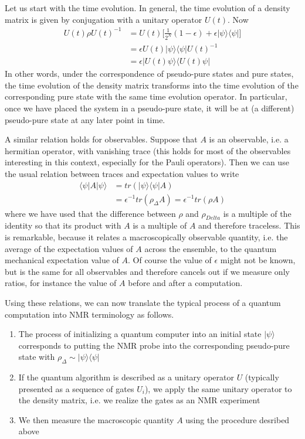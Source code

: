 \documentclass[a4paper, draft]{article}
\theoremstyle{own}
\theoremstyle{remark}
\begin{document}
Let us start with the time evolution. In general, the time evolution of a density matrix is given by conjugation with a unitary operator $U(t)$. Now
\begin{align*}
U(t) \rho U(t)^{-1} &= U(t) \big[   \frac{1}{2^N} (1-\epsilon) + \epsilon |\psi \rangle \langle \psi |  \big] \\
&= \epsilon U(t) |\psi \rangle \langle \psi | U(t)^{-1} \\
&= \epsilon |U(t) \psi \rangle \langle U(t) \psi |
\end{align*}
In other words, under the correspondence of pseudo-pure states and pure states, the time evolution of the density matrix transforms into the time evolution of the corresponding pure state with the same time evolution operator. In particular, once we have placed the system in a pseudo-pure state, it will be at (a different) pseudo-pure state at any later point in time.

A similar relation holds for observables. Suppose that $A$ is an observable, i.e. a hermitian operator, with vanishing trace (this holds for most of the observables interesting in this context, especially for the Pauli operators). Then we can use the usual relation between traces and expectation values to write
\begin{align*}
\langle \psi | A | \psi \rangle &= tr (|\psi \rangle \langle \psi | A) \\
&=  \epsilon^{-1} tr(\rho_{\Delta} A) =  \epsilon^{-1} tr(\rho A)
\end{align*}
where we have used that the difference between $\rho$ and $\rho_{Delta}$ is a multiple of the identity so that its product with $A$ is a multiple of $A$ and therefore traceless. This is remarkable, because it relates a macroscopically observable quantity, i.e. the average of the expectation values of $A$ across the ensemble, to the quantum mechanical expectation value of $A$. Of course the value of $\epsilon$ might not be known, but is the same for all observables and therefore cancels out if we measure only ratios, for instance the value of $A$ before and after a computation.

Using these relations, we can now translate the typical process of a quantum computation into NMR terminology as follows. 

\begin{enumerate}
	\item The process of initializing a quantum computer into an initial state $|\psi \rangle$ corresponds to putting the NMR probe into the corresponding pseudo-pure state with $\rho_{\Delta} \sim |\psi \rangle \langle \psi|$
	\item If the quantum algorithm is described as a unitary operator $U$ (typically presented as a sequence of gates $U_i$), we apply the same unitary operator to the density matrix, i.e. we realize the gates as an NMR experiment
	\item We then measure the macroscopic quantity $A$ using the procedure desribed above
\end{enumerate}
\end{document}
